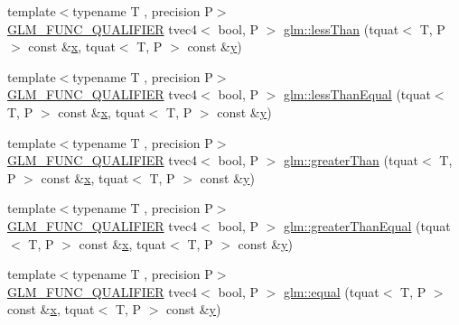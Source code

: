 \begin{DoxyCompactItemize}
\item 
{\footnotesize template$<$typename T , precision P$>$ }\\\mbox{\hyperlink{setup_8hpp_a33fdea6f91c5f834105f7415e2a64407}{G\+L\+M\+\_\+\+F\+U\+N\+C\+\_\+\+Q\+U\+A\+L\+I\+F\+I\+ER}} tvec4$<$ bool, P $>$ \mbox{\hyperlink{group__gtc__quaternion_ga91a40d16a3b5bb47d71ac1a3fb688ffa}{glm\+::less\+Than}} (tquat$<$ T, P $>$ const \&\mbox{\hyperlink{glad_8h_a92d0386e5c19fb81ea88c9f99644ab1d}{x}}, tquat$<$ T, P $>$ const \&\mbox{\hyperlink{glad_8h_a66ddd433d2cacfe27f5906b7e86faeed}{y}})
\item 
{\footnotesize template$<$typename T , precision P$>$ }\\\mbox{\hyperlink{setup_8hpp_a33fdea6f91c5f834105f7415e2a64407}{G\+L\+M\+\_\+\+F\+U\+N\+C\+\_\+\+Q\+U\+A\+L\+I\+F\+I\+ER}} tvec4$<$ bool, P $>$ \mbox{\hyperlink{group__gtc__quaternion_ga7c81996ed2724f26fe76faf352c76294}{glm\+::less\+Than\+Equal}} (tquat$<$ T, P $>$ const \&\mbox{\hyperlink{glad_8h_a92d0386e5c19fb81ea88c9f99644ab1d}{x}}, tquat$<$ T, P $>$ const \&\mbox{\hyperlink{glad_8h_a66ddd433d2cacfe27f5906b7e86faeed}{y}})
\item 
{\footnotesize template$<$typename T , precision P$>$ }\\\mbox{\hyperlink{setup_8hpp_a33fdea6f91c5f834105f7415e2a64407}{G\+L\+M\+\_\+\+F\+U\+N\+C\+\_\+\+Q\+U\+A\+L\+I\+F\+I\+ER}} tvec4$<$ bool, P $>$ \mbox{\hyperlink{group__gtc__quaternion_ga09d21a588ae425ac7517ea65cc59a5ae}{glm\+::greater\+Than}} (tquat$<$ T, P $>$ const \&\mbox{\hyperlink{glad_8h_a92d0386e5c19fb81ea88c9f99644ab1d}{x}}, tquat$<$ T, P $>$ const \&\mbox{\hyperlink{glad_8h_a66ddd433d2cacfe27f5906b7e86faeed}{y}})
\item 
{\footnotesize template$<$typename T , precision P$>$ }\\\mbox{\hyperlink{setup_8hpp_a33fdea6f91c5f834105f7415e2a64407}{G\+L\+M\+\_\+\+F\+U\+N\+C\+\_\+\+Q\+U\+A\+L\+I\+F\+I\+ER}} tvec4$<$ bool, P $>$ \mbox{\hyperlink{group__gtc__quaternion_ga0906a221a2037519fcf316ea5c1e3b3e}{glm\+::greater\+Than\+Equal}} (tquat$<$ T, P $>$ const \&\mbox{\hyperlink{glad_8h_a92d0386e5c19fb81ea88c9f99644ab1d}{x}}, tquat$<$ T, P $>$ const \&\mbox{\hyperlink{glad_8h_a66ddd433d2cacfe27f5906b7e86faeed}{y}})
\item 
{\footnotesize template$<$typename T , precision P$>$ }\\\mbox{\hyperlink{setup_8hpp_a33fdea6f91c5f834105f7415e2a64407}{G\+L\+M\+\_\+\+F\+U\+N\+C\+\_\+\+Q\+U\+A\+L\+I\+F\+I\+ER}} tvec4$<$ bool, P $>$ \mbox{\hyperlink{group__gtc__quaternion_gac187115710365e0b2902220b9611e7b6}{glm\+::equal}} (tquat$<$ T, P $>$ const \&\mbox{\hyperlink{glad_8h_a92d0386e5c19fb81ea88c9f99644ab1d}{x}}, tquat$<$ T, P $>$ const \&\mbox{\hyperlink{glad_8h_a66ddd433d2cacfe27f5906b7e86faeed}{y}})

\end{DoxyCompactItemize}
